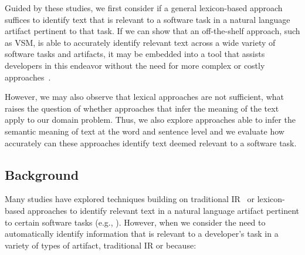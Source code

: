 Guided by these studies, we first consider if a general lexicon-based approach suffices to identify text that is relevant to a software task in a natural language artifact pertinent to that task. 
If we can show that an off-the-shelf approach, such as \acs{VSM}, is able to accurately identify relevant text across a wide variety of software tasks and artifacts, 
it may be embedded into a tool that assists developers in this endeavor without the need for more complex or costly approaches~\cite{Rastkar2013}.




However, we may also observe that lexical approaches are not sufficient, what raises the question of whether approaches that infer the meaning of the text apply to our domain problem.
Thus, we also explore approaches able to infer the semantic meaning of text at the word and sentence level 
and we evaluate how accurately can these approaches identify text deemed relevant to a software task.




\subsection{Background}






















Many studies have explored techniques building on traditional \acf{IR}~\cite{Manning2009IR} or lexicon-based approaches to identify relevant text in a natural language artifact pertinent to  
certain software tasks (e.g.,  ). %
However, when we consider the need to automatically identify information that is relevant to a developer's task
in a variety of types of artifact, traditional \acs{IR} or  because:








